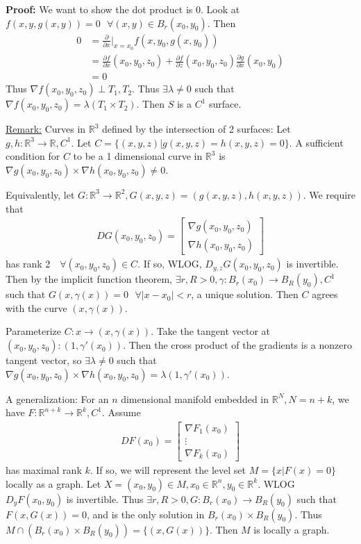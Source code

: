 \documentclass{article}
\newcommand*{\txt}[1]{\text{ #1 }}%
\newcommand*{\fora}{\txt{}\forall}%
\newcommand*{\rr}{\mathbb{R}}%
\newcommand*{\partials}[2]{\frac{\partial #1}{\partial #2}}%
\begin{document}
\textbf{Proof:} We want to show the dot product is 0. Look at $f(x,y,g(x,y))=0\fora (x,y)\in B_r(x_0,y_0)$. Then \begin{align*}
    0&=\partials{}{x}|_{x=x_0}f(x,y_0,g(x,y_0))\\
    &=\partials{f}{x}(x_0,y_0,z_0)+\partials{f}{z}(x_0,y_0,z_0)\partials{g}{x}(x_0,y_0)\\
    &=0
\end{align*}Thus $\nabla f(x_0,y_0,z_0)\perp T_1, T_2$. Thus $\exists \lambda\neq 0$ such that $\nabla f(x_0,y_0,z_0)=\lambda(T_1\times T_2)$. Then $S$ is a $C^1$ surface.

\underline{Remark:} Curves in $\rr^3$ defined by the intersection of 2 surfaces: Let $g,h:\rr^3\to \rr,C^1$. Let $C=\{(x,y,z)|g(x,y,z)=h(x,y,z)=0\}$. A sufficient condition for $C$ to be a 1 dimensional curve in $\rr^3$ is $\nabla g(x_0,y_0,z_0)\times \nabla h(x_0,y_0,z_0)\neq 0$.

Equivalently, let $G:\rr^3\to \rr^2, G(x,y,z)=(g(x,y,z),h(x,y,z))$. We require that \begin{align*}
    DG(x_0,y_0,z_0)=\begin{bmatrix}
        \nabla g(x_0,y_0,z_0)\\
        \nabla h(x_0,y_0,z_0)
    \end{bmatrix}
\end{align*}has rank 2 $\fora (x_0,y_0,z_0)\in C$. If so, WLOG, $D_{y,z}G(x_0,y_0,z_0)$ is invertible. Then by the implicit function theorem, $\exists r,R>0, \gamma:B_r(x_0)\to B_R(y_0), C^1$ such that $G(x,\gamma(x))=0\fora |x-x_0|<r$, a unique solution. Then $C$ agrees with the curve $(x,\gamma(x))$.

Parameterize $C: x\to (x,\gamma(x))$. Take the tangent vector at $(x_0,y_0,z_0): (1,\gamma'(x_0))$. Then the cross product of the gradients is a nonzero tangent vector, so $\exists \lambda\neq 0$ such that $\nabla g(x_0,y_0,z_0)\times \nabla h(x_0,y_0,z_0)=\lambda(1,\gamma'(x_0))$.

A generalization: For an $n$ dimensional manifold embedded in $\rr^N,N=n+k$, we have $F:\rr^{n+k}\to \rr^k, C^1$. Assume \begin{align*}
    DF(x_0)=\begin{bmatrix}
        \nabla F_1(x_0)\\
        \vdots\\
        \nabla F_k(x_0)
    \end{bmatrix}
\end{align*}has maximal rank $k$. If so, we will represent the level set $M=\{x|F(x)=0\}$ locally as a graph. Let $X=(x_0,y_0)\in M,x_0\in \rr^n, y_0\in \rr^k$. WLOG $D_yF(x_0,y_0)$ is invertible. Thus $\exists r,R>0, G:B_r(x_0)\to B_R(y_0)$ such that $F(x,G(x))=0$, and is the only solution in $B_r(x_0)\times B_R(y_0)$. Thus $M\cap (B_r(x_0)\times B_R(y_0))=\{(x,G(x))\}$. Then $M$ is locally a graph.
\end{document}
